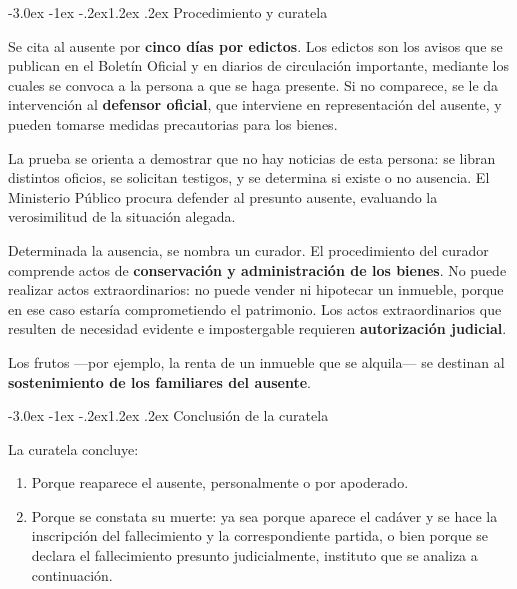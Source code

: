\documentclass[12pt,oneside]{book}
\makeatletter
\renewcommand\section{\@startsection{section}{1}{\z@}%
  {-3.0ex \@plus -1ex \@minus -.2ex}{1.2ex \@plus .2ex}%
  {\normalfont\large\bfseries\color{acento}}}
\makeatother
\begin{document}
\section{Procedimiento y curatela}

Se cita al ausente por \textbf{cinco días por edictos}. Los edictos son
los avisos que se publican en el Boletín Oficial y en diarios de
circulación importante, mediante los cuales se convoca a la persona a que
se haga presente. Si no comparece, se le da intervención al
\textbf{defensor oficial}, que interviene en representación del ausente,
y pueden tomarse medidas precautorias para los bienes.

La prueba se orienta a demostrar que no hay noticias de esta persona: se
libran distintos oficios, se solicitan testigos, y se determina si existe
o no ausencia. El Ministerio Público procura defender al presunto
ausente, evaluando la verosimilitud de la situación alegada.

Determinada la ausencia, se nombra un curador. El procedimiento del
curador comprende actos de \textbf{conservación y administración de los
bienes}. No puede realizar actos extraordinarios: no puede vender ni
hipotecar un inmueble, porque en ese caso estaría comprometiendo el
patrimonio. Los actos extraordinarios que resulten de necesidad evidente e
impostergable requieren \textbf{autorización judicial}.

Los frutos ---por ejemplo, la renta de un inmueble que se alquila--- se
destinan al \textbf{sostenimiento de los familiares del ausente}.

\section{Conclusión de la curatela}

La curatela concluye:

\begin{enumerate}[label=(\alph*)]
    \item Porque reaparece el ausente, personalmente o por apoderado.
    \item Porque se constata su muerte: ya sea porque aparece el cadáver y se hace la inscripción del fallecimiento y la correspondiente partida, o bien porque se declara el fallecimiento presunto judicialmente, instituto que se analiza a continuación.
\end{enumerate}

\end{document}

